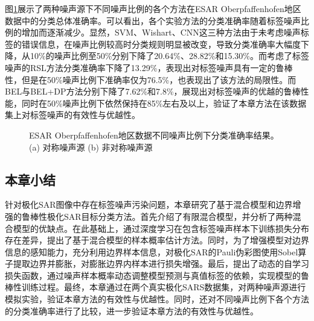 图\ref{fig:ober_noise}展示了两种噪声源下不同噪声比例的各个方法在ESAR Oberpfaffenhofen地区数据中的分类总体准确率。可以看出，各个实验方法的分类准确率随着标签噪声比例的增加而逐渐减少。显然，SVM、Wishart、CNN这三种方法由于未考虑噪声标签的错误信息，在噪声比例较高时分类规则明显被改变，导致分类准确率大幅度下降，从10\%的噪声比例至50\%分别下降了20.64\%、28.82\%和15.30\%。而考虑了标签噪声的RSL方法分类准确率下降了13.29\%，表现出对标签噪声具有一定的鲁棒性，但是在50\%噪声比例下准确率仅为76.5\%，也表现出了该方法的局限性。而BEL与BEL+DP方法分别下降了7.62\%和7.8\%，展现出对标签噪声的优越的鲁棒性能，同时在50\%噪声比例下依然保持在85\%左右及以上，验证了本章方法在该数据集上对标签噪声的有效性与优越性。
\begin{figure}[ht!]
    \caption{ESAR Oberpfaffenhofen地区数据不同噪声比例下分类准确率结果。(a) 对称噪声源 (b) 非对称噪声源}
    \label{fig:ober_noise}
\end{figure}

\subsection{本章小结}
针对极化SAR图像中存在标签噪声污染问题，本章研究了基于混合模型和边界增强的鲁棒性极化SAR目标分类方法。首先介绍了有限混合模型，并分析了两种混合模型的优缺点。在此基础上，通过深度学习在包含标签噪声样本下训练损失分布存在差异，提出了基于混合模型的样本概率估计方法。同时，为了增强模型对边界信息的感知能力，充分利用边界样本信息，对极化SAR的Pauli伪彩图使用Sobel算子提取边界并膨胀，对膨胀边界内样本进行损失增强。最后，提出了动态的自学习损失函数，通过噪声样本概率动态调整模型预测与真值标签的依赖，实现模型的鲁棒性训练过程。最终，本章通过在两个真实极化SARS数据集，对两种噪声源进行模拟实验，验证本章方法的有效性与优越性。同时，还对不同噪声比例下各个方法的分类准确率进行了比较，进一步验证本章方法的有效性与优越性。